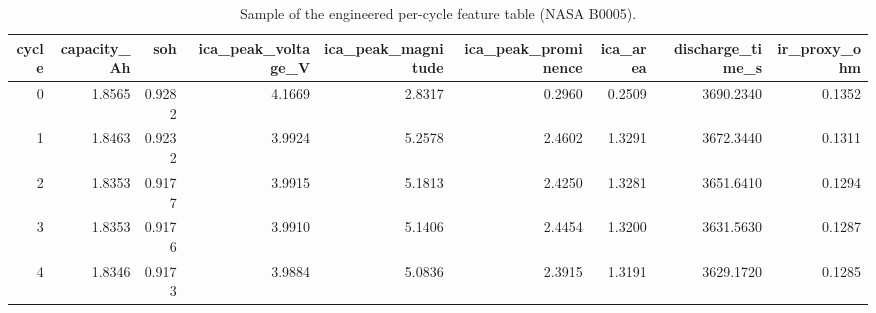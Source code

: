 \begin{table}
\caption{Sample of the engineered per-cycle feature table (NASA B0005).}
\label{tab:feature_table_preview_b0005}
\begin{tabular}{rrrrrrrrr}
\toprule
cycle & capacity\_Ah & soh & ica\_peak\_voltage\_V & ica\_peak\_magnitude & ica\_peak\_prominence & ica\_area & discharge\_time\_s & ir\_proxy\_ohm \\
\midrule
0 & 1.8565 & 0.9282 & 4.1669 & 2.8317 & 0.2960 & 0.2509 & 3690.2340 & 0.1352 \\
1 & 1.8463 & 0.9232 & 3.9924 & 5.2578 & 2.4602 & 1.3291 & 3672.3440 & 0.1311 \\
2 & 1.8353 & 0.9177 & 3.9915 & 5.1813 & 2.4250 & 1.3281 & 3651.6410 & 0.1294 \\
3 & 1.8353 & 0.9176 & 3.9910 & 5.1406 & 2.4454 & 1.3200 & 3631.5630 & 0.1287 \\
4 & 1.8346 & 0.9173 & 3.9884 & 5.0836 & 2.3915 & 1.3191 & 3629.1720 & 0.1285 \\
\bottomrule
\end{tabular}
\end{table}
